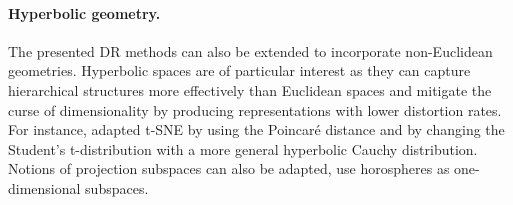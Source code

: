 \paragraph{Hyperbolic geometry.} The presented DR methods can also be extended to incorporate non-Euclidean geometries. Hyperbolic spaces \cite{Chami21, Fan_2022_CVPR, Guo22, Lin23} are of particular interest as they can capture hierarchical structures more effectively than Euclidean spaces and mitigate the curse of dimensionality by producing representations with lower distortion rates. 
For instance, \citet{Guo22} adapted t-SNE by using the Poincaré distance and by changing the Student's t-distribution with a more general hyperbolic Cauchy distribution.  Notions of projection subspaces can also be adapted, \eg \citet{Chami21} use horospheres as one-dimensional subspaces. 










